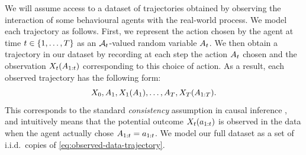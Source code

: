 We will assume access to a dataset of trajectories obtained by observing the interaction of some behavioural agents with the real-world process.
We model each trajectory as follows.
First, we represent the action chosen by the agent at time $t \in \{1, \ldots, T\}$ as an $\mathcal{A}_t$-valued random variable $A_t$.
We then obtain a trajectory in our dataset by recording at each step the action $A_t$ chosen and the observation $X_t(A_{1:t})$ corresponding to this choice of action.
As a result, each observed trajectory has the following form:
\begin{equation} \label{eq:observed-data-trajectory}
    X_0, A_1, X_1(A_1), \ldots, A_T, X_T(A_{1:T}).
\end{equation}
This corresponds to the standard \emph{consistency} assumption in causal inference \citep{hernan2020causal}, and intuitively means that the potential outcome $X_t(a_{1:t})$ is observed in the data when the agent actually chose $A_{1:t} = a_{1:t}$.
We model our full dataset as a set of i.i.d.\ copies of \eqref{eq:observed-data-trajectory}. %



